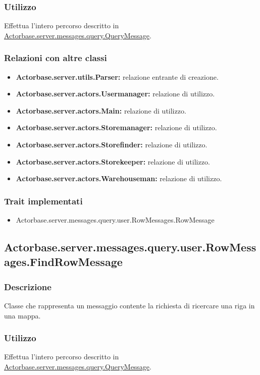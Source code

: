 \documentclass[a4paper]{article}
\begin{document}
			\subsubsection{Utilizzo}
				Effettua l'intero percorso descritto in \hyperref[QueryMessage]{Actorbase.server.messages.query.QueryMessage}.
				
			\subsubsection{Relazioni con altre classi}
				\begin{itemize}
					\item \textbf{Actorbase.server.utils.Parser:} relazione entrante di creazione.
					\item \textbf{Actorbase.server.actors.Usermanager:} relazione di utilizzo.
					\item \textbf{Actorbase.server.actors.Main:} relazione di utilizzo.
					\item \textbf{Actorbase.server.actors.Storemanager:} relazione di utilizzo.
					\item \textbf{Actorbase.server.actors.Storefinder:} relazione di utilizzo.
					\item \textbf{Actorbase.server.actors.Storekeeper:} relazione di utilizzo.
					\item \textbf{Actorbase.server.actors.Warehouseman:} relazione di utilizzo.
				\end{itemize}
			\subsubsection{Trait implementati}
				\begin{itemize}
					\item Actorbase.server.messages.query.user.RowMessages.RowMessage
				\end{itemize}
				
		\subsection{Actorbase.server.messages.query.user.RowMessages.FindRowMessage}
			\subsubsection{Descrizione}
				Classe che rappresenta un messaggio contente la richiesta di ricercare una riga in una mappa.
				
			\subsubsection{Utilizzo}
				Effettua l'intero percorso descritto in \hyperref[QueryMessage]{Actorbase.server.messages.query.QueryMessage}.
				
\end{document}
